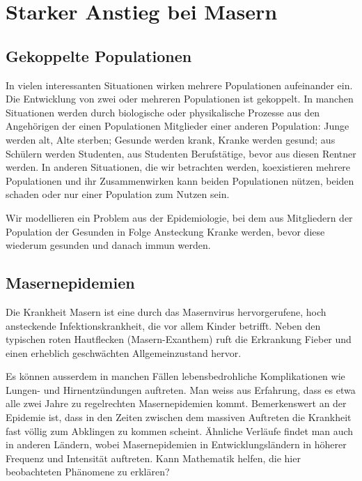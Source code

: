 \documentclass[%
11pt,%
twoside,%
titlepage,%
german,%
headsepline%
]{scrartcl}
\begin{document}
\section{Starker Anstieg bei Masern}
\subsection{Gekoppelte Populationen}
In
vielen interessanten Situationen wirken mehrere Populationen aufeinander ein. Die
Entwicklung von zwei oder mehreren Populationen ist gekoppelt. In manchen Situationen werden durch biologische oder physikalische Prozesse aus den Angehörigen der einen Populationen Mitglieder einer anderen Population: Junge werden alt, Alte sterben; Gesunde werden krank, Kranke werden gesund; aus Schülern werden Studenten, aus Studenten Berufstätige, bevor aus diesen Rentner werden. In anderen Situationen, die wir betrachten werden, koexistieren mehrere Populationen und ihr Zusammenwirken kann beiden Populationen nützen, beiden schaden oder nur einer Population zum Nutzen sein.

Wir modellieren ein Problem aus der Epidemiologie, bei dem aus Mitgliedern der Population der Gesunden in Folge Ansteckung Kranke werden, bevor diese wiederum gesunden und danach immun werden.

\subsection{Masernepidemien}
Die Krankheit Masern ist eine durch das Masernvirus hervorgerufene, hoch ansteckende Infektionskrankheit, die vor allem Kinder betrifft. Neben den typischen roten Hautflecken (Masern-Exanthem) ruft die Erkrankung Fieber und einen erheblich geschwächten Allgemeinzustand hervor.

Es können ausserdem in manchen Fällen lebensbedrohliche Komplikationen wie Lun\-gen- und Hirnentzündungen auftreten. Man weiss aus Erfahrung, dass es etwa alle zwei Jahre zu regelrechten Masernepidemien kommt. Bemerkenswert an der Epidemie ist, dass in den Zeiten zwischen dem massiven Auftreten die Krankheit fast völlig zum Abklingen zu kommen scheint. Ähnliche Verläufe findet man auch in anderen Ländern, wobei Masernepidemien in Entwicklungsländern in höherer Frequenz und Intensität auftreten. Kann Mathematik helfen, die hier beobachteten Phänomene zu erklären?
\end{document}
